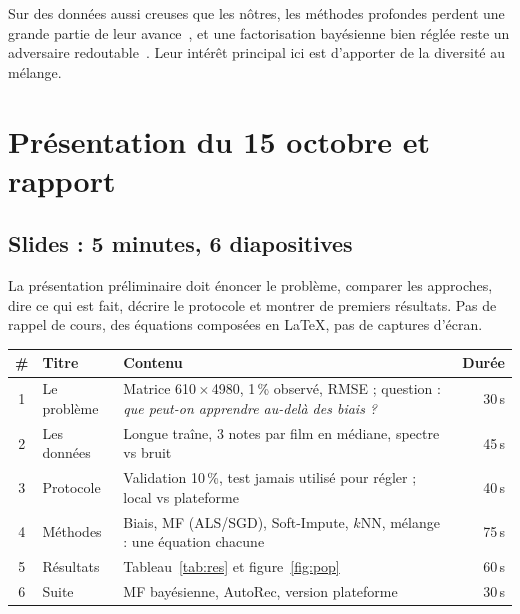 \documentclass[11pt,a4paper]{article}
\begin{document}
\begin{retenir}
Sur des données aussi creuses que les nôtres, les méthodes profondes perdent
une grande partie de leur avance~\cite{glocalk}, et une factorisation
bayésienne bien réglée reste un adversaire redoutable~\cite{rendle2019,rendle2020}.
Leur intérêt principal ici est d'apporter de la diversité au mélange.
\end{retenir}

\section{Présentation du 15 octobre et rapport}

\subsection{Slides : 5 minutes, 6 diapositives}

La présentation préliminaire doit énoncer le problème, comparer les approches,
dire ce qui est fait, décrire le protocole et montrer de premiers résultats. Pas
de rappel de cours, des équations composées en \LaTeX{}, pas de captures
d'écran.

\begin{table}[H]
\centering
\begin{tabular}{@{}clp{8.2cm}r@{}}
\toprule
\textbf{\#} & \textbf{Titre} & \textbf{Contenu} & \textbf{Durée} \\
\midrule
1 & Le problème & Matrice 610\,$\times$\,4980, 1\,\% observé, RMSE ; question : \emph{que peut-on apprendre au-delà des biais ?} & 30\,s \\
2 & Les données & Longue traîne, 3 notes par film en médiane, spectre vs bruit & 45\,s \\
3 & Protocole & Validation 10\,\%, test jamais utilisé pour régler ; local vs plateforme & 40\,s \\
4 & Méthodes & Biais, MF (ALS/SGD), Soft-Impute, $k$NN, mélange : une équation chacune & 75\,s \\
5 & Résultats & Tableau~\ref{tab:res} et figure~\ref{fig:pop} & 60\,s \\
6 & Suite & MF bayésienne, AutoRec, version plateforme & 30\,s \\
\bottomrule
\end{tabular}
\end{table}
\end{document}
